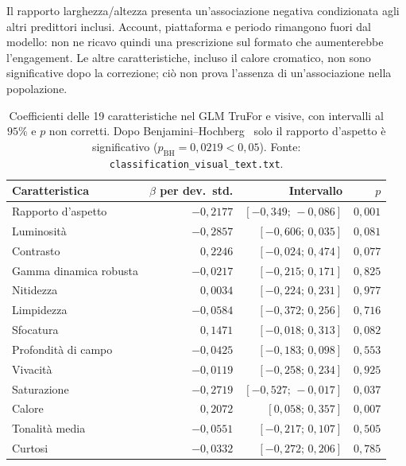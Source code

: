 Il rapporto larghezza/altezza presenta un'associazione negativa condizionata agli altri predittori inclusi. Account, piattaforma e periodo rimangono fuori dal modello: non ne ricavo quindi una prescrizione sul formato che aumenterebbe l'engagement. Le altre caratteristiche, incluso il calore cromatico, non sono significative dopo la correzione; ciò non prova l'assenza di un'associazione nella popolazione.

\begin{table}[htbp]
    \centering\small
    \caption{Coefficienti delle 19 caratteristiche nel GLM TruFor e visive, con intervalli al $95\%$ e $p$ non corretti. Dopo Benjamini--Hochberg~\cite{10.1111/j.2517-6161.1995.tb02031.x} solo il rapporto d'aspetto è significativo ($p_{\mathrm{BH}}=0{,}0219<0{,}05$). Fonte: \texttt{classification\_visual\_text.txt}.}
    \label{tab:associazione-visive-coefficienti}
    \begin{tabular}{@{}lrrr@{}}
        \toprule
        Caratteristica & $\beta$ per dev.\ std. & Intervallo & $p$ \\
        \midrule
        Rapporto d'aspetto & $-0{,}2177$ & $[-0{,}349;\,-0{,}086]$ & $0{,}001$ \\
        Luminosità & $-0{,}2857$ & $[-0{,}606;\,0{,}035]$ & $0{,}081$ \\
        Contrasto & $0{,}2246$ & $[-0{,}024;\,0{,}474]$ & $0{,}077$ \\
        Gamma dinamica robusta & $-0{,}0217$ & $[-0{,}215;\,0{,}171]$ & $0{,}825$ \\
        Nitidezza & $0{,}0034$ & $[-0{,}224;\,0{,}231]$ & $0{,}977$ \\
        Limpidezza & $-0{,}0584$ & $[-0{,}372;\,0{,}256]$ & $0{,}716$ \\
        Sfocatura & $0{,}1471$ & $[-0{,}018;\,0{,}313]$ & $0{,}082$ \\
        Profondità di campo & $-0{,}0425$ & $[-0{,}183;\,0{,}098]$ & $0{,}553$ \\
        Vivacità & $-0{,}0119$ & $[-0{,}258;\,0{,}234]$ & $0{,}925$ \\
        Saturazione & $-0{,}2719$ & $[-0{,}527;\,-0{,}017]$ & $0{,}037$ \\
        Calore & $0{,}2072$ & $[0{,}058;\,0{,}357]$ & $0{,}007$ \\
        Tonalità media & $-0{,}0551$ & $[-0{,}217;\,0{,}107]$ & $0{,}505$ \\
        Curtosi & $-0{,}0332$ & $[-0{,}272;\,0{,}206]$ & $0{,}785$ \\

\end{tabular}
\end{table}
